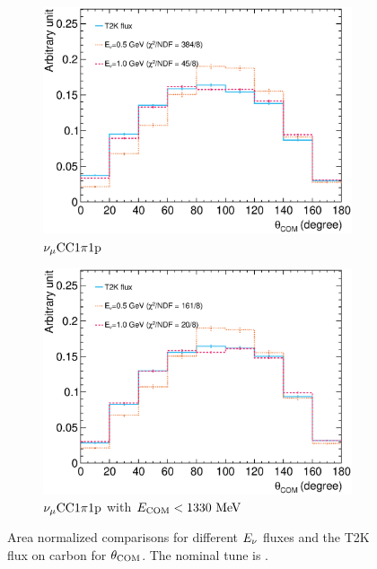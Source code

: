      \begin{figure}[ht!]
     \centering
     \begin{subfigure}[ht!]{\dbfigwid\textwidth}
          \centering
          \includegraphics[width=\textwidth]{figures/COM/anorm-enu-c-9bin-_da_tan.eps}
          \caption{$\nu_{\mu}\textrm{CC}1\pi1\textrm{p}$}
          \label{subfig:enu-comp-cc1pi1p-c}
     \end{subfigure}
     \begin{subfigure}[ht!]{\dbfigwid\textwidth}
          \centering
          \includegraphics[width=\textwidth]{figures/COM/anorm-enu-c-9bin-wcut_da_tan.eps}
          \caption{$\nu_{\mu}\textrm{CC}1\pi1\textrm{p}$ with $E_{\textrm{COM}}<1330~\textrm{MeV}$}
          \label{subfig:enu-comp-dpp-c}
     \end{subfigure}
     \caption{Area normalized comparisons for different $E_{\nu}$ fluxes and the T2K flux on carbon for $\theta_{\textrm{COM}}$. The nominal tune is \gZero.}
     \label{fig:enu-comp-c}
     \end{figure}

